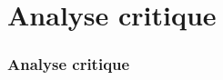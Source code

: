 \section{Analyse critique}

    \begin{frame}
        \frametitle{Analyse critique}


    \end{frame}
